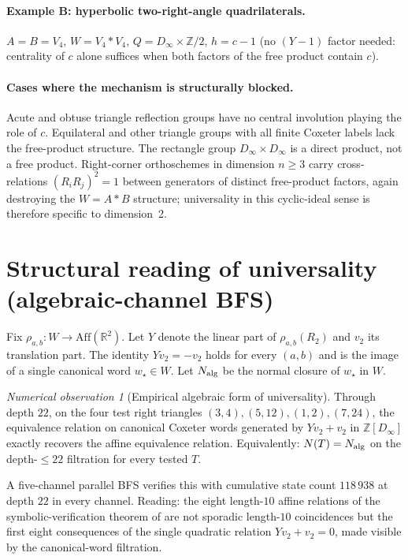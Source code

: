 \documentclass[11pt,a4paper]{article}
\theoremstyle{remark}
\newtheorem{observation}{Numerical observation}
\theoremstyle{plain}
\begin{document}
\paragraph{Example B: hyperbolic two-right-angle quadrilaterals.}
$A = B = V_4$, $W = V_4 * V_4$, $Q = D_\infty \times \mathbb{Z}/2$,
$h = c - 1$ (no $(Y-1)$ factor needed: centrality of $c$ alone suffices
when both factors of the free product contain $c$).

\paragraph{Cases where the mechanism is structurally blocked.}  Acute
and obtuse triangle reflection groups have no central involution
playing the role of $c$.  Equilateral and other triangle groups with
all finite Coxeter labels lack the free-product structure.  The
rectangle group $D_\infty \times D_\infty$ is a direct product, not a
free product.  Right-corner orthoschemes in dimension $n \ge 3$ carry
cross-relations $(R_i R_j)^2 = 1$ between generators of distinct
free-product factors, again destroying the $W = A * B$ structure;
universality in this cyclic-ideal sense is therefore specific to
dimension~2.

\section{Structural reading of universality (algebraic-channel BFS)}
\label{sec:univ-algebraic}

Fix $\rho_{a,b}: W \to \mathrm{Aff}(\mathbb{R}^2)$.  Let $Y$ denote the
linear part of $\rho_{a,b}(R_2)$ and $v_2$ its translation part.  The
identity $Y v_2 = -v_2$ holds for every $(a, b)$ and is the image of a
single canonical word $w_\star \in W$.  Let $N_{\rm alg}$ be the normal
closure of $w_\star$ in $W$.

\begin{observation}[Empirical algebraic form of universality]
\label{obs:alg-structural}
Through depth $22$, on the four test right triangles $(3, 4), (5, 12),
(1, 2), (7, 24)$, the equivalence relation on canonical Coxeter words
generated by $Y v_2 + v_2$ in $\mathbb{Z}[D_\infty]$ exactly recovers
the affine equivalence relation.  Equivalently: $N(T) = N_{\rm alg}$ on
the depth-$\le 22$ filtration for every tested $T$.
\end{observation}

A five-channel parallel BFS verifies this with cumulative state count
$118\,938$ at depth $22$ in every channel.  Reading: the eight
length-$10$ affine relations of the symbolic-verification theorem of \cite{Bonfioli2} are not
sporadic length-$10$ coincidences but the first eight consequences of
the single quadratic relation $Y v_2 + v_2 = 0$, made visible by the
canonical-word filtration.
\end{document}
